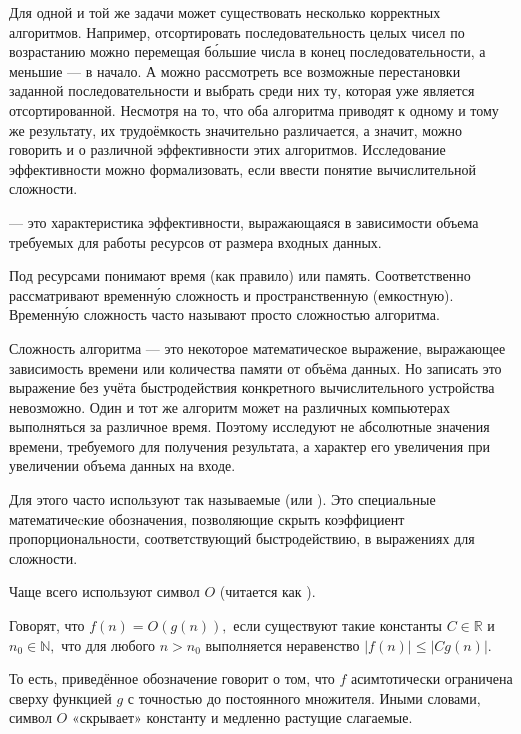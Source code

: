 Для одной и той же задачи может существовать несколько корректных
алгоритмов. Например, отсортировать последовательность целых чисел по
возрастанию можно перемещая бо́льшие числа в конец последовательности,
а меньшие — в начало. А можно рассмотреть все возможные перестановки
заданной последовательности и выбрать среди них ту, которая уже
является отсортированной. Несмотря на то, что оба алгоритма приводят к
одному и тому же результату, их трудоёмкость значительно различается,
а значит, можно говорить и о различной эффективности этих
алгоритмов. Исследование эффективности можно формализовать, если
ввести понятие вычислительной сложности.

\begin{defn}
   — это
  характеристика эффективности, выражающаяся в зависимости объема
  требуемых для работы ресурсов от размера входных данных.
\end{defn}

Под ресурсами понимают время (как правило) или память. Соответственно
рассматривают временну́ю сложность и пространственную (емкостную).
Временну́ю сложность часто называют просто сложностью алгоритма.

Сложность алгоритма — это некоторое математическое выражение,
выражающее зависимость времени или количества памяти от объёма
данных. Но записать это выражение без учёта быстродействия конкретного
вычислительного устройства невозможно.  Один и тот же алгоритм может
на различных компьютерах выполняться за различное время. Поэтому
исследуют не абсолютные значения времени, требуемого для получения
результата, а характер его увеличения при увеличении объема данных на
входе.

Для этого часто используют так называемые  (или ). Это
специальные математичеcкие обозначения, позволяющие скрыть коэффициент
пропорциональности, соответствующий быстродействию, в выражениях для
сложности.

Чаще всего используют символ $O$ (читается как ).

\begin{defn}
  Говорят, что $f(n)=O(g(n)),$ если существуют такие константы
  $C\in\mathbb{R}$ и $n_{0}\in\mathbb{N},$ что для любого $n>n_{0}$
  выполняется неравенство $|f(n)|\leqslant|Cg(n)|.$
\end{defn}

То есть, приведённое обозначение говорит о том, что $f$ асимтотически
ограничена сверху функцией $g$ с точностью до постоянного
множителя. Иными словами, символ $O$ «скрывает» константу и медленно
растущие слагаемые.

